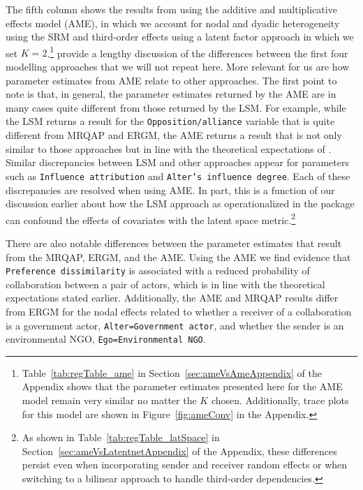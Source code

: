 The fifth column shows the results from using the additive and multiplicative effects model (AME), in which we account for nodal and dyadic heterogeneity using the SRM and third-order effects using a latent factor approach in which we set $K=2$.\footnote{Table~\ref{tab:regTable_ame} in Section~\ref{sec:ameVsAmeAppendix} of the Appendix shows that the parameter estimates presented here for the AME model remain very similar no matter the $K$ chosen. Additionally, trace plots for this model are shown in Figure~\ref{fig:ameConv} in the Appendix.} \citet{cranmer:etal:2016} provide a lengthy discussion of the differences between the first four modelling approaches that we will not repeat here. More relevant for us are how parameter estimates from AME relate to other approaches. The first point to note is that, in general, the parameter estimates returned by the AME are in many cases quite different from those returned by the LSM. For example, while the LSM returns a result for the \texttt{Opposition/alliance} variable that is quite different from MRQAP and ERGM, the AME returns a result that is not only similar to those approaches but in line with the theoretical expectations of \citet{ingold:fischer:2014}. Similar discrepancies between LSM and other approaches appear for parameters such as \texttt{Influence attribution} and \texttt{Alter's influence degree}. Each of these discrepancies are resolved when using AME. In part, this is a function of our discussion earlier about how the LSM approach as operationalized in the  package can confound the effects of covariates with the latent space metric.\footnote{As shown in Table~\ref{tab:regTable_latSpace} in Section~\ref{sec:ameVsLatentnetAppendix} of the Appendix, these differences persist even when incorporating sender and receiver random effects or when switching to a bilinear approach to handle third-order dependencies.}


\FloatBarrier

There are also notable differences between the parameter estimates that result from the MRQAP, ERGM, and the AME. Using the AME we find evidence that \texttt{Preference dissimilarity} is associated with a reduced probability of collaboration between a pair of actors, which is in line with the theoretical expectations stated earlier. Additionally, the AME and MRQAP results differ from ERGM for the nodal effects related to whether a receiver of a collaboration is a government actor, \texttt{Alter=Government actor}, and whether the sender is an environmental NGO, \texttt{Ego=Environmental NGO}.

